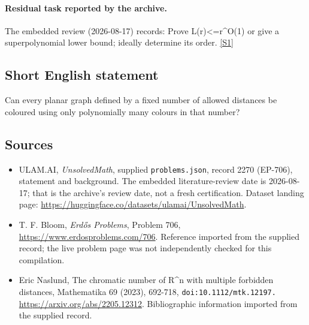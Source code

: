\documentclass[11pt,a4paper]{article}
\newcommand{\sref}[2]{\hyperlink{source:#1:#2}{[S#2]}}
\begin{document}
\paragraph{Residual task reported by the archive.}

The embedded review (2026-08-17) records: Prove L(r)<=r\textasciicircum{}{O(1)} or give a superpolynomial lower bound; ideally determine its order. \sref{2270}{1}

\subsection{Short English statement}

Can every planar graph defined by a fixed number of allowed distances be coloured using only polynomially many colours in that number?

\subsection{Sources}

{\small

\begin{itemize}

\item[\hypertarget{source:2270:1}{S1}] ULAM.AI, \emph{UnsolvedMath}, supplied \texttt{problems.json}, record 2270 (EP-706), statement and background. The embedded literature-review date is 2026-08-17; that is the archive’s review date, not a fresh certification. Dataset landing page: \url{https://huggingface.co/datasets/ulamai/UnsolvedMath}.

\item[\hypertarget{source:2270:2}{S2}] T. F. Bloom, \emph{Erdős Problems}, Problem 706, \url{https://www.erdosproblems.com/706}. Reference imported from the supplied record; the live problem page was not independently checked for this compilation.

\item[\hypertarget{source:2270:3}{S3}] Eric Naslund, The chromatic number of R\textasciicircum{}n with multiple forbidden distances, Mathematika 69 (2023), 692-718, \nolinkurl{doi:10.1112/mtk.12197.} \url{https://arxiv.org/abs/2205.12312}. Bibliographic information imported from the supplied record.

\end{itemize}

}

\label{end:2270}
\end{document}
